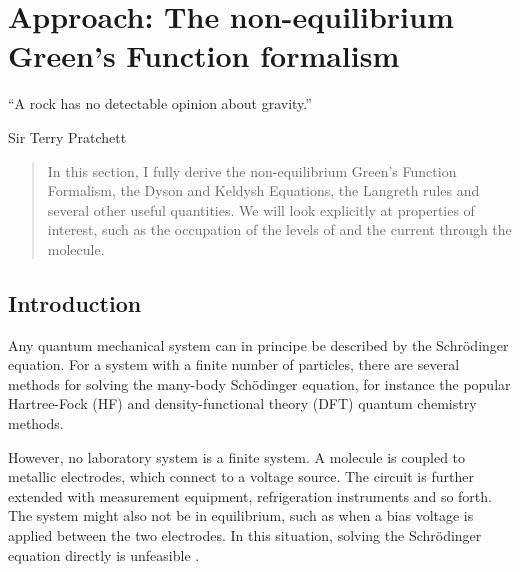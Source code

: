 \chapter{Approach: The non-equilibrium Green's Function formalism}
\label{ch:chapter_2}




\epigraph{
    “A rock has no detectable opinion about gravity.”
}{Sir Terry Pratchett}

\begin{abstract}
In this section, I fully derive the non-equilibrium Green's Function Formalism, the Dyson and Keldysh Equations, the Langreth rules and several other useful quantities. We will look explicitly at properties of interest, such as the occupation of the levels of and the current through the molecule.
\end{abstract}

\newpage
\section{Introduction}
Any quantum mechanical system can in principe be described by the Schr\"odinger equation. For a system with a finite number of particles, there are several methods for solving the many-body Sch\"odinger equation, for instance the popular Hartree-Fock (HF) and density-functional theory (DFT) quantum chemistry methods.

However, no laboratory system is a finite system. A molecule is coupled to metallic electrodes, which connect to a voltage source. The circuit is further extended with measurement equipment, refrigeration instruments and so forth. The system might also not be in equilibrium, such as when a bias voltage is applied between the two electrodes. In this situation, solving the Schr\"odinger equation directly is unfeasible \cite{seldenthuis}.

